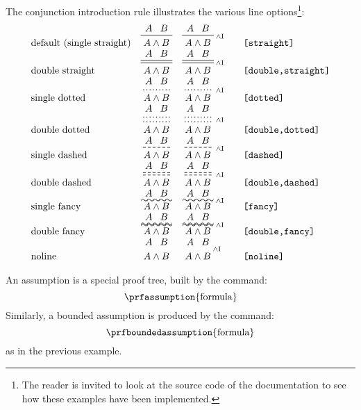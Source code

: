 \documentclass{amsart}
\begin{document}
The conjunction introduction rule illustrates the various line
options\footnote{The reader is invited to look at the source code of
  the documentation to see how these examples have been implemented.}:
\begin{displaymath}
  \begin{array}{lcc@{\qquad}l}
    \mbox{default (single straight)} &
    \prftree{A}{B}{A \wedge B} &
    \prftree[r]{$\scriptstyle\wedge\mathrm{I}$}
    {A}{B}{A \wedge B} &
    \texttt{[straight]} \\
    \mbox{double straight} &
    \prftree[d]{A}{B}{A \wedge B} &
    \prftree[d,r]{$\scriptstyle\wedge\mathrm{I}$}
    {A}{B}{A \wedge B} &
    \texttt{[double,straight]} \\
    \mbox{single dotted} &
    \prftree[dotted]{A}{B}{A \wedge B} &
    \prftree[dotted,r]{$\scriptstyle\wedge\mathrm{I}$}
    {A}{B}{A \wedge B} &
    \texttt{[dotted]} \\
    \mbox{double dotted} &
    \prftree[dotted,d]{A}{B}{A \wedge B} &
    \prftree[dotted,d,r]{$\scriptstyle\wedge\mathrm{I}$}
    {A}{B}{A \wedge B} &
    \texttt{[double,dotted]} \\
    \mbox{single dashed} &
    \prftree[dashed]{A}{B}{A \wedge B} &
    \prftree[dashed,r]{$\scriptstyle\wedge\mathrm{I}$}
    {A}{B}{A \wedge B} &
    \texttt{[dashed]} \\
    \mbox{double dashed} &
    \prftree[dashed,d]{A}{B}{A \wedge B} &
    \prftree[dashed,d,r]{$\scriptstyle\wedge\mathrm{I}$}
    {A}{B}{A \wedge B} &
    \texttt{[double,dashed]} \\
    \mbox{single fancy} &
    \prftree[f]{A}{B}{A \wedge B} &
    \prftree[f,r]{$\scriptstyle\wedge\mathrm{I}$}
    {A}{B}{A \wedge B} &
    \texttt{[fancy]} \\
    \mbox{double fancy} &
    \prftree[f,d]{A}{B}{A \wedge B} &
    \prftree[f,d,r]{$\scriptstyle\wedge\mathrm{I}$}
    {A}{B}{A \wedge B} &
    \texttt{[double,fancy]} \\
    \mbox{noline} &
    \prftree[noline]{A}{B}{A \wedge B} &
    \prftree[noline,r]{$\scriptstyle\wedge\mathrm{I}$}
    {A}{B}{A \wedge B} &
    \texttt{[noline]}
  \end{array}
\end{displaymath}\vspace{1ex}

An assumption is a special proof tree, built by the command:
\begin{displaymath}
  \verb|\prfassumption|\{\text{formula}\}
\end{displaymath}
Similarly, a bounded assumption is produced by the command:
\begin{displaymath}
  \verb|\prfboundedassumption|\{\text{formula}\}
\end{displaymath}
as in the previous example.
\end{document}
